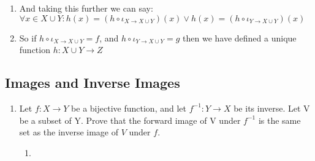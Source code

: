 \documentclass{article}
\begin{document}
\begin{enumerate}
\begin{enumerate}
\begin{enumerate}
                        \item And taking this further we can say: $\forall
                            x \in X \cup Y: h(x) = (h \circ {\iota}_{X
                            \rightarrow X \cup Y})(x) \lor h(x) = (h \circ
                            {\iota}_{Y \rightarrow X \cup Y})(x)$
                        \item So if $h \circ {\iota}_{X \rightarrow X \cup Y} =
                            f$, and $h \circ {\iota}_{Y \rightarrow X \cup Y} =
                            g$ then we have defined a unique function $h: X
                            \cup Y \rightarrow Z$ 
                    \end{enumerate}
            \end{enumerate}
    \end{enumerate}
    \subsection{Images and Inverse Images}
    \begin{enumerate}
        \item Let $f: X \rightarrow Y$ be a bijective function, and let
            $f^{-1}: Y \rightarrow X$ be its inverse.  Let V be a subset of Y.
            Prove that the forward image of V under $f^{-1}$ is the same set as
            the inverse image of $V$ under $f$.
            \begin{enumerate}
                \item 
            \end{enumerate}
            
    \end{enumerate}
\end{document}
